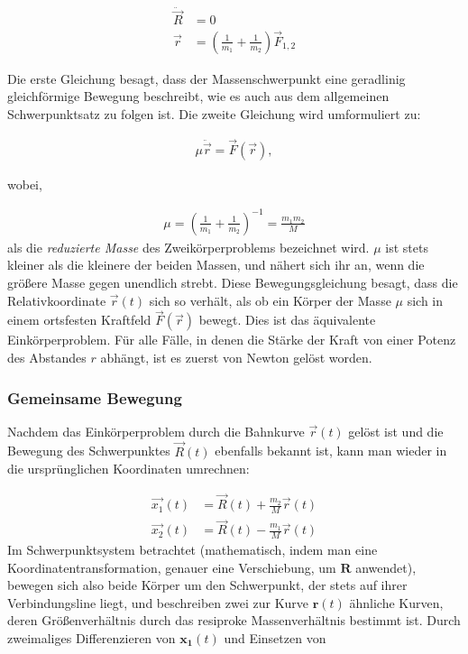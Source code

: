 \documentclass[a4paper,12pt,twoside]{article}
\begin{document}
\begin{align*}
	\ddot{\vec{R}} &= 0 \\
	\vec{r} &= \left( \frac{1}{m_1} + \frac{1}{m_2} \right) \vec{F}_{1,2}
\end{align*}


Die erste Gleichung besagt, dass der Massenschwerpunkt eine geradlinig gleichförmige Bewegung beschreibt, wie es auch aus dem allgemeinen Schwerpunktsatz zu folgen ist. Die zweite Gleichung wird umformuliert zu:

\begin{align*}
\mu \ddot{\vec{r}} = \vec{F}(\vec{r}),
\end{align*}

wobei,

\begin{align*}
\mu = \left( \frac{1}{m_1} + \frac{1}{m_2} \right)^{-1} = \frac{m_1 m_2}{M}
\end{align*}
als die \textit{reduzierte Masse} des Zweikörperproblems bezeichnet wird. $\mu$ ist stets kleiner als die kleinere der beiden Massen, und nähert sich ihr an, wenn die größere Masse gegen unendlich strebt. Diese Bewegungsgleichung besagt, dass die Relativkoordinate $\vec{r}(t)$ sich so verhält, als ob ein Körper der Masse $\mu$ sich in einem ortsfesten Kraftfeld $\vec{F}(\vec{r})$ bewegt. Dies ist das äquivalente Einkörperproblem. Für alle Fälle, in denen die Stärke der Kraft von einer Potenz des Abstandes $r$ abhängt, ist es zuerst von Newton gelöst worden.

\subsubsection{Gemeinsame Bewegung}
Nachdem das Einkörperproblem durch die Bahnkurve $\vec{r}(t)$
gelöst ist und die Bewegung des Schwerpunktes $\vec{R}(t)$
ebenfalls bekannt ist, kann man wieder in die ursprünglichen Koordinaten umrechnen:

\begin{align*}
	\vec{x_1}(t) &= \vec{R}(t) + \frac{m_2}{M} \vec{r}(t) \\
	\vec{x_2}(t) &= \vec{R}(t) - \frac{m_1}{M} \vec{r}(t)
\end{align*}
Im Schwerpunktsystem betrachtet (mathematisch, indem man eine Koordinatentransformation, genauer eine Verschiebung, um \( \mathbf{R} \) anwendet), bewegen sich also beide Körper um den Schwerpunkt, der stets auf ihrer Verbindungsline liegt, und beschreiben zwei zur Kurve \( \mathbf{r}(t) \) ähnliche Kurven, deren Größenverhältnis durch das resiproke Massenverhältnis bestimmt ist. Durch zweimaliges Differenzieren von \( \mathbf{x_1}(t) \) und Einsetzen von
\end{document}
